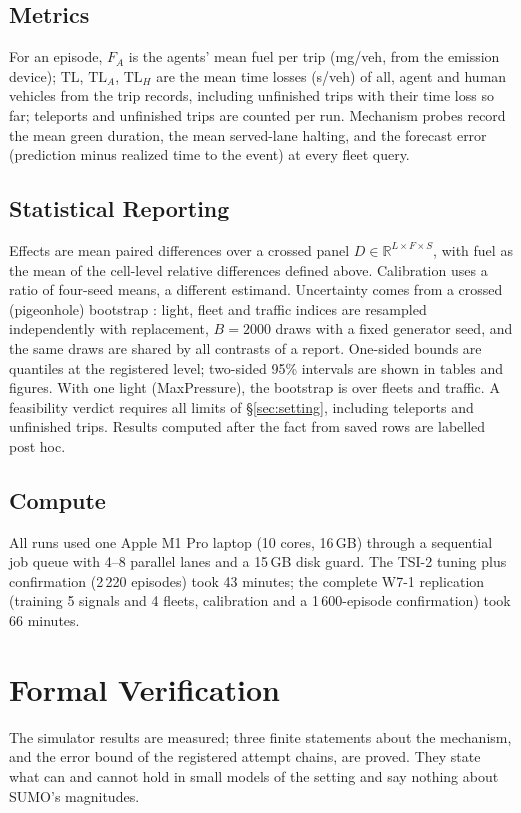 \subsection{Metrics}
For an episode, $F_A$ is the agents' mean fuel per trip (mg/veh, from the emission device); $\mathrm{TL}$, $\mathrm{TL}_A$, $\mathrm{TL}_H$ are the mean
time losses (s/veh) of all, agent and human vehicles from the trip records, including unfinished trips with their time loss so far;
teleports and unfinished trips are counted per run. Mechanism probes record the mean green duration, the mean served-lane halting, and the
forecast error (prediction minus realized time to the event) at every fleet query.

\subsection{Statistical Reporting}
Effects are mean paired differences over a crossed panel $D\in\mathbb R^{L\times F\times S}$, with fuel as the mean of the cell-level relative differences defined above. Calibration uses a ratio of four-seed means, a different estimand. Uncertainty
comes from a crossed (pigeonhole) bootstrap \cite{owen2007,efron1993}: light, fleet and traffic indices are resampled independently with
replacement, $B=2000$ draws with a fixed generator seed, and the same draws are shared by all contrasts of a report. One-sided bounds are
quantiles at the registered level; two-sided 95\% intervals are shown in tables and figures. With one light (MaxPressure), the bootstrap is
over fleets and traffic. A feasibility verdict requires all limits of §\ref{sec:setting}, including teleports and unfinished trips.
Results computed after the fact from saved rows are labelled post hoc.

\subsection{Compute}
All runs used one Apple M1 Pro laptop (10 cores, 16\,GB) through a sequential job queue with 4--8 parallel lanes and a 15\,GB disk guard.
The TSI-2 tuning plus confirmation (2\,220 episodes) took 43 minutes; the complete W7-1 replication (training 5 signals and 4 fleets,
calibration and a 1\,600-episode confirmation) took 66 minutes.

\section{Formal Verification}\label{sec:verification}
The simulator results are measured; three finite statements about the mechanism, and the error bound of the registered attempt chains,
are proved. They state what can and cannot hold in small models of the setting and say nothing about SUMO's magnitudes.

